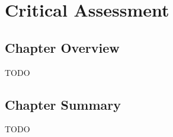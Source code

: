 \chapter{Critical Assessment}
\label{chap:assessment}

\section{Chapter Overview}


TODO

\section{Chapter Summary}

TODO
